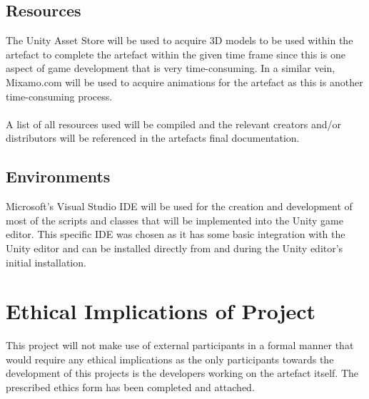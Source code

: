 \subsection{Resources}
The Unity Asset Store will be used to acquire 3D models to be used within the artefact to complete the artefact within the given time frame since this is one aspect of game development that is very time-consuming. In a similar vein, Mixamo.com will be used to acquire animations for the artefact as this is another time-consuming process.
\\\\
A list of all resources used will be compiled and the relevant creators and/or distributors will be referenced in the artefacts final documentation.  

\subsection{Environments}
Microsoft's Visual Studio IDE will be used for the creation and development of most of the scripts and classes that will be implemented into the Unity game editor. This specific IDE was chosen as it has some basic integration with the Unity editor and can be installed directly from and during the Unity editor's initial installation.

\section{Ethical Implications of Project}
This project will not make use of external participants in a formal manner that would require any ethical implications as the only participants towards the development of this projects is the developers working on the artefact itself. The prescribed ethics form has been completed and attached.


